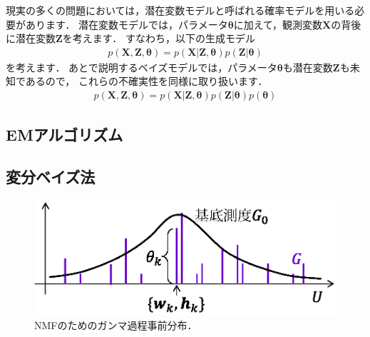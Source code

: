 現実の多くの問題においては，潜在変数モデルと呼ばれる確率モデルを用いる必要があります．
潜在変数モデルでは，パラメータ$\bm\theta$に加えて，観測変数$\bm{X}$の背後に潜在変数$\bm{Z}$を考えます．
すなわち，以下の生成モデル
\begin{align}
p(\bm{X},\bm{Z},\bm\theta) = p(\bm{X}|\bm{Z},\bm\theta) p(\bm{Z} | \bm\theta)
\end{align}
を考えます．
あとで説明するベイズモデルでは，パラメータ$\bm\theta$も潜在変数$\bm{Z}$も未知であるので，
これらの不確実性を同様に取り扱います．
\begin{align}
p(\bm{X},\bm{Z},\bm\theta) = p(\bm{X}|\bm{Z},\bm\theta) p(\bm{Z} | \bm\theta) p(\bm\theta)
\end{align}

\subsection{EMアルゴリズム}

\subsection{変分ベイズ法}
\label{sec:vb}

\begin{figure}[t]
\centering
\includegraphics[width=.8\linewidth]{sections/music/gap}
\caption{NMFのためのガンマ過程事前分布．}
\label{fig:gap}
\end{figure}

